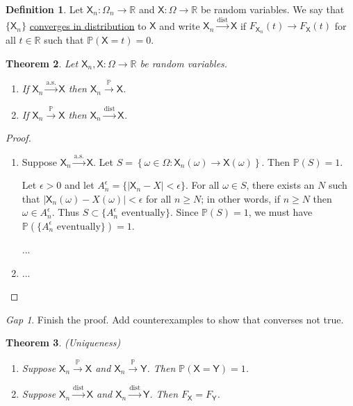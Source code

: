 \documentclass[11pt]{article}
\newcommand{\rv}[1]{\mathsf{#1}}
\newcommand{\p}{\mathbb{P}}
\newcommand{\defname}[1]{\underline{#1}}
\newcommand{\asto}{\xrightarrow{\text{a.s.}}}
\newcommand{\pto}{\xrightarrow{\p}}
\newcommand{\disto}{\xrightarrow{\text{dist}}}
\newcommand{\RR}{\mathbb{R}}
\theoremstyle{theorem}
\newtheorem{theorem}{Theorem}[section]
\theoremstyle{definition}
\newtheorem{definition}[theorem]{Definition}
\theoremstyle{remark}
\theoremstyle{step}
\theoremstyle{gap}
\newtheorem*{gap}{Gap}
\begin{document}
\begin{definition}\label{def.disto}
Let \(\rv{X}_n : \Omega_n \to \RR\) and \(\rv{X}:\Omega \to \RR\) be random variables. We say that \(\{\rv{X}_n\}\) \defname{converges in distribution} to \(\rv{X}\) and write \(\rv{X}_n \disto \rv{X}\) if \(F_{\rv{X}_n}(t) \to F_\rv{X}(t)\) for all \(t\in\RR\) such that \(\p\left(\rv{X}=t\right) = 0\). 
\end{definition}

\begin{theorem}
Let \(\rv{X}_n, \rv{X} : \Omega\to \RR\) be random variables.
\begin{enumerate}
\item
If \(\rv{X}_n \asto \rv{X}\) then \(\rv{X}_n \pto \rv{X}\).
\item
If \(\rv{X}_n \pto \rv{X}\) then \(\rv{X}_n \disto \rv{X}\).
\end{enumerate}
\end{theorem}

\begin{proof}\ 
\begin{enumerate}
\item
Suppose \(\rv{X}_n \asto \rv{X}\). Let \(S = \left\{\omega \in \Omega : \rv{X}_n(\omega) \to \rv{X}(\omega)\right\}\). Then \(\p(S) = 1\). 

Let \(\epsilon > 0\) and let \(A_n^\epsilon = \{|\rv{X}_n-X| < \epsilon\}\). For all \(\omega \in S\), there exists an \(N\) such that \(|\rv{X}_n(\omega) - X(\omega)| < \epsilon\) for all \(n \geq N\); in other words, if \(n \geq N\) then \(\omega \in A_n^\epsilon\). Thus \(S \subset \{A_n^\epsilon \text{ eventually}\}\). Since \(\p(S) = 1\), we must have \(\p\left(\{A_n^\epsilon \text{ eventually}\}\right) = 1\).

...


%
%


\item
...
\end{enumerate}
\end{proof}

\begin{gap}
Finish the proof. Add counterexamples to show that converses not true.
\end{gap}

\begin{theorem}{(Uniqueness)}
\begin{enumerate}
\item
Suppose \(\rv{X}_n \pto \rv{X}\) and \(\rv{X}_n \pto \rv{Y}\). Then \(\p(\rv{X}=\rv{Y}) = 1\).
\item
Suppose \(\rv{X}_n \disto \rv{X}\) and \(\rv{X}_n \disto \rv{Y}\). Then \(F_\rv{X} = F_\rv{Y}\).
\end{enumerate}
\end{theorem}
\end{document}
